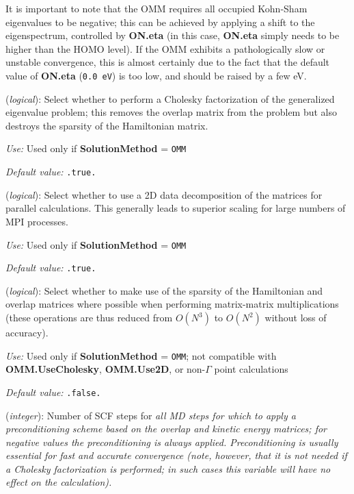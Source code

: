 It is important to note that the OMM requires all occupied Kohn-Sham
eigenvalues to be negative; this can be achieved by applying a shift
to the eigenspectrum, controlled by \textbf{ON.eta} (in this case,
\textbf{ON.eta} simply needs to be higher than the HOMO level). If the OMM
exhibits a pathologically slow or unstable convergence, this is almost
certainly due to the fact that the default value of \textbf{ON.eta}
(\texttt{0.0 eV}) is too low, and should be raised by a few eV.

\begin{description}
\itemsep 10pt
\parsep 0pt

\item[\textbf{OMM.UseCholesky}] (\textit{logical}):
Select whether to perform a Cholesky factorization of the generalized eigenvalue
problem; this removes the overlap matrix from the problem but also destroys the
sparsity of the Hamiltonian matrix.

\textit{Use:} Used only if \textbf{SolutionMethod} = \texttt{OMM}

\textit{Default value:} \texttt{.true.}

\item[\textbf{OMM.Use2D}] (\textit{logical}):
Select whether to use a 2D data decomposition of the matrices for parallel
calculations. This generally leads to superior scaling for large numbers of MPI
processes.

\textit{Use:} Used only if \textbf{SolutionMethod} = \texttt{OMM}

\textit{Default value:} \texttt{.true.}

\item[\textbf{OMM.UseSparse}] (\textit{logical}):
Select whether to make use of the sparsity of the Hamiltonian and overlap
matrices where possible when performing matrix-matrix multiplications (these
operations are thus reduced from $O(N^3)$ to $O(N^2)$ without loss of
accuracy).

\textit{Use:} Used only if \textbf{SolutionMethod} = \texttt{OMM}; not compatible with
\textbf{OMM.UseCholesky}, \textbf{OMM.Use2D}, or non-$\Gamma$ point calculations

\textit{Default value:} \texttt{.false.}

\item[\textbf{OMM.Precon}] (\textit{integer}):
Number of SCF steps for \em{all} MD steps for which to apply a preconditioning
scheme based on the overlap and kinetic energy matrices; for negative values the
preconditioning is always applied. Preconditioning is usually essential for fast
and accurate convergence (note, however, that it is not needed if a Cholesky
factorization is performed; in such cases this variable will have no effect on
the calculation).


\end{description}
